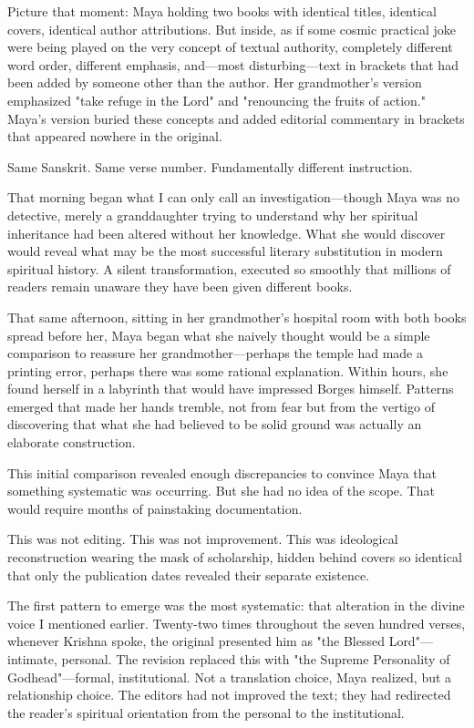 \documentclass[12pt,twoside]{book}
\begin{document}
Picture that moment: Maya holding two books with identical titles, identical covers, identical author attributions. But inside, as if some cosmic practical joke were being played on the very concept of textual authority, completely different word order, different emphasis, and—most disturbing—text in brackets that had been added by someone other than the author. Her grandmother's version emphasized "take refuge in the Lord" and "renouncing the fruits of action." Maya's version buried these concepts and added editorial commentary in brackets that appeared nowhere in the original.

Same Sanskrit. Same verse number. Fundamentally different instruction.

That morning began what I can only call an investigation—though Maya was no detective, merely a granddaughter trying to understand why her spiritual inheritance had been altered without her knowledge. What she would discover would reveal what may be the most successful literary substitution in modern spiritual history. A silent transformation, executed so smoothly that millions of readers remain unaware they have been given different books.

That same afternoon, sitting in her grandmother's hospital room with both books spread before her, Maya began what she naively thought would be a simple comparison to reassure her grandmother—perhaps the temple had made a printing error, perhaps there was some rational explanation. Within hours, she found herself in a labyrinth that would have impressed Borges himself. Patterns emerged that made her hands tremble, not from fear but from the vertigo of discovering that what she had believed to be solid ground was actually an elaborate construction.

This initial comparison revealed enough discrepancies to convince Maya that something systematic was occurring. But she had no idea of the scope. That would require months of painstaking documentation.

This was not editing. This was not improvement. This was ideological reconstruction wearing the mask of scholarship, hidden behind covers so identical that only the publication dates revealed their separate existence.

The first pattern to emerge was the most systematic: that alteration in the divine voice I mentioned earlier. Twenty-two times throughout the seven hundred verses, whenever Krishna spoke, the original presented him as "the Blessed Lord"—intimate, personal. The revision replaced this with "the Supreme Personality of Godhead"—formal, institutional. Not a translation choice, Maya realized, but a relationship choice. The editors had not improved the text; they had redirected the reader's spiritual orientation from the personal to the institutional.
\end{document}
